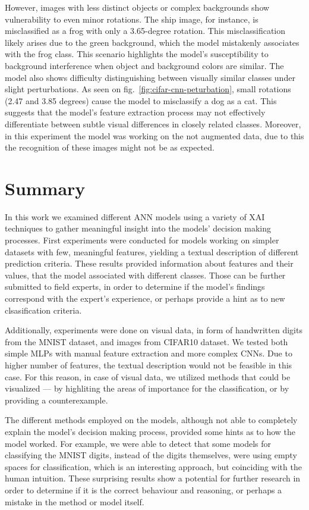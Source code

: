 \documentclass[journal, a4paper]{IEEEtran}
\begin{document}
However, images with less distinct objects or complex backgrounds show vulnerability to even minor rotations.
The ship image, for instance, is misclassified as a frog with only a 3.65-degree rotation.
This misclassification likely arises due to the green background, which the model mistakenly associates with the frog class.
This scenario highlights the model's susceptibility to background interference when object and background colors are similar.
The model also shows difficulty distinguishing between visually similar classes under slight perturbations.
As seen on fig.~\ref{fig:cifar-cnn-peturbation}, small rotations (2.47 and 3.85 degrees) cause the model to misclassify a dog as a cat.
This suggests that the model's feature extraction process may not effectively differentiate between subtle visual differences in closely related classes.
Moreover, in this experiment the model was working on the not augmented data, due to this the recognition of these images might not be as expected.

\section{Summary}\label{sec:summary}

In this work we examined different ANN models using a variety of XAI techniques to gather meaningful insight into the models' decision making processes.
First experiments were conducted for models working on simpler datasets with few, meaningful features, yielding a textual description of different prediction criteria.
These results provided information about features and their values, that the model associated with different classes.
Those can be further submitted to field experts, in order to determine if the model's findings correspond with the expert's experience, or perhaps provide a hint as to new clsasification criteria.

Additionally, experiments were done on visual data, in form of handwritten digits from the MNIST dataset, and images from CIFAR10 dataset.
We tested both simple MLPs with manual feature extraction and more complex CNNs.
Due to higher number of features, the textual description would not be feasible in this case.
For this reason, in case of visual data, we utilized methods that could be visualized --- by highliting the areas of importance for the classification, or by providing a counterexample.

The different methods employed on the models, although not able to completely explain the model's decision making process,
provided some hints as to how the model worked.
For example, we were able to detect that some models for classifying the MNIST digits, instead of the digits themselves, were using empty spaces for classification, which is an interesting approach, but coinciding with the human intuition.
These surprising results show a potential for further research in order to determine if it is the correct behaviour and reasoning, or perhaps a mistake in the method or model itself.
\end{document}
